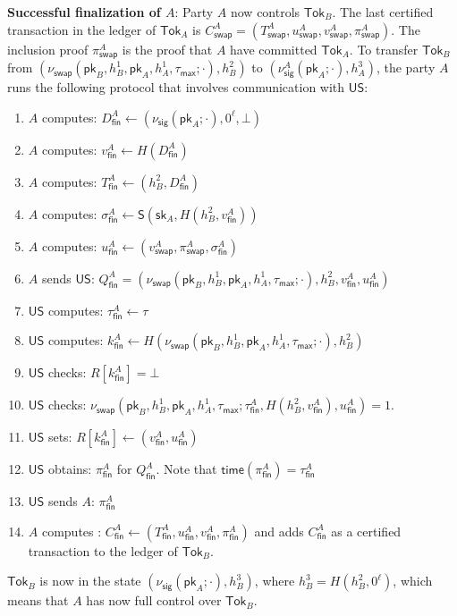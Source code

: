 \documentclass{article}
\newcommand{\sig}[0]{\mathsf{S}}
\newcommand{\pubkey}[0]{\mathsf{pk}}
\newcommand{\prikey}[0]{\mathsf{sk}}
\newcommand{\unisrv}[0]{\mathsf{US}}
\begin{document}
\noindent\textbf{Successful finalization of $A$}: Party $A$ now controls $\mathsf{Tok}_B$.
The last certified transaction in the ledger of $\mathsf{Tok}_A$ is
$C^A_\mathsf{swap}=(T^A_\mathsf{swap},u^A_\mathsf{swap},v^A_\mathsf{swap},\pi^A_\mathsf{swap})$. The inclusion proof $\pi^A_\mathsf{swap}$ is the proof that $A$ have committed $\mathsf{Tok}_A$.
To transfer $\mathsf{Tok}_B$ from
$(\nu_\mathsf{swap}(\pubkey_B,h^1_B,\pubkey_A,h^1_A,\tau_\mathsf{max};\cdot),h^2_B)$
 to $(\nu^A_\mathsf{sig}(\pubkey_A;\cdot),h^3_A)$, the party $A$ runs the following protocol that involves communication with $\unisrv$:
\begin{enumerate}
    \item $A$ computes: $D^A_\mathsf{fin}\gets (\nu_\mathsf{sig}(\pubkey_A;\cdot), 0^\ell,\bot)$
    \item $A$ computes: $v^A_\mathsf{fin}\gets H(D^A_\mathsf{fin})$
    \item $A$ computes: $T^A_\mathsf{fin}\gets (h^2_B, D^A_\mathsf{fin})$
    \item $A$ computes: $\sigma^A_\mathsf{fin}\gets \sig(\prikey_A,H(h^2_B,v^A_\mathsf{fin}))$
    \item $A$ computes: $u^A_\mathsf{fin}\gets (v^A_\mathsf{swap},\pi^A_\mathsf{swap},\sigma^A_\mathsf{fin})$
    \item $A$ sends $\unisrv$: $Q^A_\mathsf{fin}=(\nu_\mathsf{swap}(\pubkey_B,h^1_B,\pubkey_A,h^1_A,\tau_\mathsf{max};\cdot),h^2_B,v^A_\mathsf{fin},u^A_\mathsf{fin})$
    \item $\unisrv$ computes: $\tau^A_\mathsf{fin}\gets \tau$
    \item $\unisrv$ computes: $k^A_\mathsf{fin}\gets H(\nu_\mathsf{swap}(\pubkey_B,h^1_B,\pubkey_A,h^1_A,\tau_\mathsf{max};\cdot),h^2_B)$
    \item $\unisrv$ checks: $R[k^A_\mathsf{fin}]=\bot$
    \item $\unisrv$ checks: $\nu_\mathsf{swap}(\pubkey_B,h^1_B,\pubkey_A,h^1_A,\tau_\mathsf{max};\tau^A_\mathsf{fin},H(h^2_B,v^A_\mathsf{fin}),u^A_\mathsf{fin})=1$.
    \item $\unisrv$ sets: $R[k^A_\mathsf{fin}]\gets (v^A_\mathsf{fin},u^A_\mathsf{fin})$
    \item $\unisrv$ obtains: $\pi^A_\mathsf{fin}$ for $Q^A_\mathsf{fin}$. Note that $\mathsf{time}(\pi^A_\mathsf{fin})=\tau^A_\mathsf{fin}$
    \item $\unisrv$ sends $A$: $\pi^A_\mathsf{fin}$
    \item $A$ computes : $C^A_\mathsf{fin}\gets (T^A_\mathsf{fin},u^A_\mathsf{fin},v^A_\mathsf{fin},\pi^A_\mathsf{fin})$ and adds $C^A_\mathsf{fin}$ as a certified transaction to the ledger of $\mathsf{Tok}_B$.
\end{enumerate}
$\mathsf{Tok}_B$ is now in the state $(\nu_\mathsf{sig}(\pubkey_A;\cdot),h^3_B)$, where $h^3_B=H(h^2_B,0^\ell)$, which means that $A$ has now full control over $\mathsf{Tok}_B$.
\medskip
\end{document}
